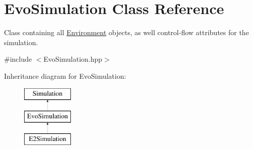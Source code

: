\hypertarget{classEvoSimulation}{}\section{Evo\+Simulation Class Reference}
\label{classEvoSimulation}


Class containing all \hyperlink{classEnvironment}{Environment} objects, as well control-\/flow attributes for the simulation.  




{\ttfamily \#include $<$Evo\+Simulation.\+hpp$>$}

Inheritance diagram for Evo\+Simulation\+:\begin{figure}[H]
\begin{center}
\leavevmode
\includegraphics[height=3.000000cm]{classEvoSimulation}
\end{center}
\end{figure}
